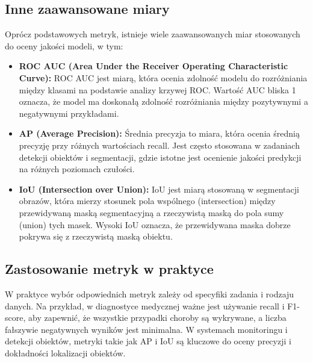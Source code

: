 \subsection*{Inne zaawansowane miary}

Oprócz podstawowych metryk, istnieje wiele zaawansowanych miar stosowanych do oceny jakości modeli, 
w tym:

\begin{itemize}
    \item \textbf{ROC AUC (Area Under the Receiver Operating Characteristic Curve): }
    ROC AUC jest miarą, która ocenia zdolność modelu do rozróżniania między klasami na podstawie 
    analizy krzywej ROC. Wartość AUC bliska 1 oznacza, że model ma doskonałą zdolność rozróżniania 
    między pozytywnymi a negatywnymi przykładami.
    \item \textbf{AP (Average Precision):} Średnia precyzja to miara, która ocenia średnią precyzję 
    przy różnych wartościach recall. Jest często stosowana w zadaniach detekcji obiektów i 
    segmentacji, gdzie istotne jest ocenienie jakości predykcji na różnych poziomach czułości.
    \item \textbf{IoU (Intersection over Union):} IoU jest miarą stosowaną w segmentacji obrazów, 
    która mierzy stosunek pola wspólnego (intersection) między przewidywaną maską segmentacyjną a 
    rzeczywistą maską do pola sumy (union) tych masek. Wysoki IoU oznacza, że przewidywana maska 
    dobrze pokrywa się z rzeczywistą maską obiektu.
\end{itemize}

\subsection*{Zastosowanie metryk w praktyce}

W praktyce wybór odpowiednich metryk zależy od specyfiki zadania i rodzaju danych. Na przykład, 
w diagnostyce medycznej ważne jest używanie recall i F1-score, aby zapewnić, że wszystkie przypadki 
choroby są wykrywane, a liczba fałszywie negatywnych wyników jest minimalna. W systemach monitoringu 
i detekcji obiektów, metryki takie jak AP i IoU są kluczowe do oceny precyzji i dokładności 
lokalizacji obiektów.
